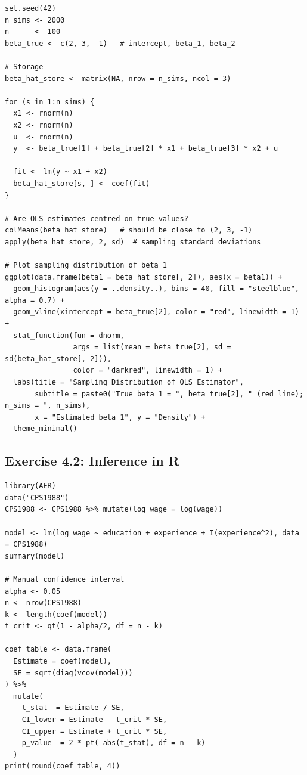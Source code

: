 \begin{lstlisting}
set.seed(42)
n_sims <- 2000
n      <- 100
beta_true <- c(2, 3, -1)   # intercept, beta_1, beta_2

# Storage
beta_hat_store <- matrix(NA, nrow = n_sims, ncol = 3)

for (s in 1:n_sims) {
  x1 <- rnorm(n)
  x2 <- rnorm(n)
  u  <- rnorm(n)
  y  <- beta_true[1] + beta_true[2] * x1 + beta_true[3] * x2 + u
  
  fit <- lm(y ~ x1 + x2)
  beta_hat_store[s, ] <- coef(fit)
}

# Are OLS estimates centred on true values?
colMeans(beta_hat_store)   # should be close to (2, 3, -1)
apply(beta_hat_store, 2, sd)  # sampling standard deviations

# Plot sampling distribution of beta_1
ggplot(data.frame(beta1 = beta_hat_store[, 2]), aes(x = beta1)) +
  geom_histogram(aes(y = ..density..), bins = 40, fill = "steelblue", alpha = 0.7) +
  geom_vline(xintercept = beta_true[2], color = "red", linewidth = 1) +
  stat_function(fun = dnorm,
                args = list(mean = beta_true[2], sd = sd(beta_hat_store[, 2])),
                color = "darkred", linewidth = 1) +
  labs(title = "Sampling Distribution of OLS Estimator",
       subtitle = paste0("True beta_1 = ", beta_true[2], " (red line); n_sims = ", n_sims),
       x = "Estimated beta_1", y = "Density") +
  theme_minimal()
\end{lstlisting}

\subsection{Exercise 4.2: Inference in R}

\begin{lstlisting}
library(AER)
data("CPS1988")
CPS1988 <- CPS1988 %>% mutate(log_wage = log(wage))

model <- lm(log_wage ~ education + experience + I(experience^2), data = CPS1988)
summary(model)

# Manual confidence interval
alpha <- 0.05
n <- nrow(CPS1988)
k <- length(coef(model))
t_crit <- qt(1 - alpha/2, df = n - k)

coef_table <- data.frame(
  Estimate = coef(model),
  SE = sqrt(diag(vcov(model)))
) %>%
  mutate(
    t_stat  = Estimate / SE,
    CI_lower = Estimate - t_crit * SE,
    CI_upper = Estimate + t_crit * SE,
    p_value  = 2 * pt(-abs(t_stat), df = n - k)
  )
print(round(coef_table, 4))
\end{lstlisting}

